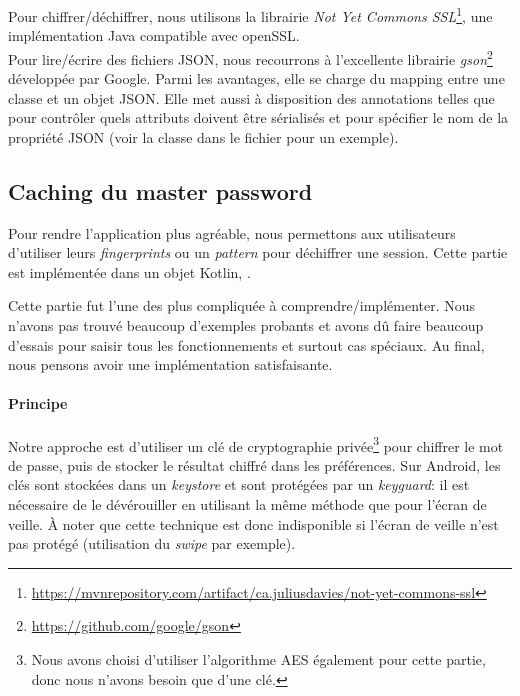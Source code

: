 Pour chiffrer/déchiffrer, nous utilisons la librairie \emph{Not Yet Commons SSL}\footnote{\url{https://mvnrepository.com/artifact/ca.juliusdavies/not-yet-commons-ssl}}, une implémentation Java compatible avec openSSL. \\
Pour lire/écrire des fichiers JSON, nous recourrons à l'excellente librairie \emph{gson}\footnote{\url{https://github.com/google/gson}} développée par Google. Parmi les avantages, elle se charge du mapping entre une classe et un objet JSON. Elle met aussi à disposition des annotations telles que  pour contrôler quels attributs doivent être sérialisés et  pour spécifier le nom de la propriété JSON (voir la classe  dans le fichier  pour un exemple). 

\subsection{Caching du master password}

Pour rendre l'application plus agréable, nous permettons aux utilisateurs d'utiliser leurs \emph{fingerprints} ou un \emph{pattern} pour déchiffrer une session. Cette partie est implémentée dans un  objet Kotlin, .

\begin{notepar}{}
    Cette partie fut l'une des plus compliquée à comprendre/implémenter. Nous n'avons pas trouvé beaucoup d'exemples probants et avons dû faire beaucoup d'essais pour saisir tous les fonctionnements et surtout cas spéciaux. Au final, nous pensons avoir une implémentation satisfaisante.
\end{notepar}

\paragraph*{Principe}
Notre approche est d'utiliser un clé de cryptographie privée\footnote{Nous avons choisi d'utiliser l'algorithme AES également pour cette partie, donc nous n'avons besoin que d'une clé.} pour chiffrer le mot de passe, puis de stocker le résultat chiffré dans les préférences. Sur Android, les clés sont stockées dans un \emph{keystore} et sont protégées par un \emph{keyguard}: il est nécessaire de le dévérouiller en utilisant la même méthode que pour l'écran de veille. À noter que cette technique est donc indisponible si l'écran de veille n'est pas protégé (utilisation du \emph{swipe} par exemple).

